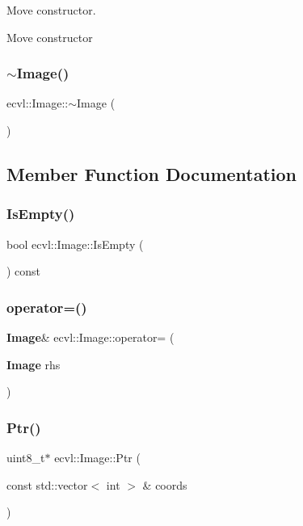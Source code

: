 Move constructor. 

Move constructor \mbox{\label{classecvl_1_1_image_a2230eb993f310b23cf7624db0d42ee7c}} 
\subsubsection{$\sim$Image()}
{\footnotesize\ttfamily ecvl\+::\+Image\+::$\sim$\+Image (\begin{DoxyParamCaption}{ }\end{DoxyParamCaption})\hspace{0.3cm}{\ttfamily [inline]}}



\subsection{Member Function Documentation}
\mbox{\label{classecvl_1_1_image_ab7dfe59beca83e189162378368dc4484}} 
\subsubsection{IsEmpty()}
{\footnotesize\ttfamily bool ecvl\+::\+Image\+::\+Is\+Empty (\begin{DoxyParamCaption}{ }\end{DoxyParamCaption}) const\hspace{0.3cm}{\ttfamily [inline]}}

\mbox{\label{classecvl_1_1_image_ab8bf9eacc2910ff606ef83f56f89aba1}} 
\subsubsection{operator=()}
{\footnotesize\ttfamily \textbf{ Image}\& ecvl\+::\+Image\+::operator= (\begin{DoxyParamCaption}\item[{\textbf{ Image}}]{rhs }\end{DoxyParamCaption})\hspace{0.3cm}{\ttfamily [inline]}}

\mbox{\label{classecvl_1_1_image_ac666790c7b5bcdb955c7d32938b1f0f9}} 
\subsubsection{Ptr()\hspace{0.1cm}{\footnotesize\ttfamily [1/2]}}
{\footnotesize\ttfamily uint8\+\_\+t$\ast$ ecvl\+::\+Image\+::\+Ptr (\begin{DoxyParamCaption}\item[{const std\+::vector$<$ int $>$ \&}]{coords }\end{DoxyParamCaption})\hspace{0.3cm}{\ttfamily [inline]}}

